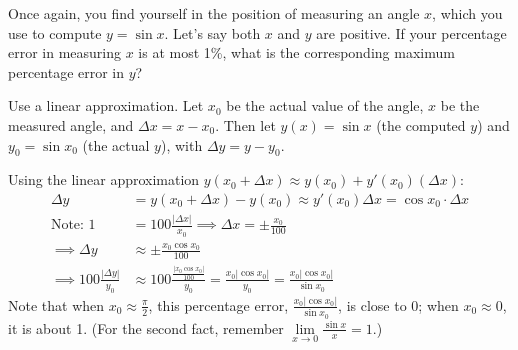 \begin{frame}[t]
\AnswerSpace
{}
Once again, you find yourself in the position of measuring an angle $x$, which you use to compute $y=\sin x$. Let's say both $x$ and $y$ are positive. If your percentage error in measuring $x$ is at most 1\%, what is the corresponding maximum percentage error in $y$?

Use a linear approximation.
\color{answercolor}\vfill\small
{}
Let $x_0$ be the actual value of the angle, $x$ be the measured angle, and $\Delta x=x-x_0$. Then let $y(x)=\sin x$ (the computed $y$) and $y_0=\sin x_0$ (the actual $y$), with $\Delta y = y-y_0$.

Using the linear approximation $y(x_0+\Delta x) \approx y(x_0)+y'(x_0)(\Delta x)$:
\begin{align*}
\Delta y &= y (x_0+\Delta x)-y(x_0) \approx y'(x_0)\Delta x  
           = \cos x_0 \cdot \Delta x\\
\mbox{Note: }1&=100\frac{|\Delta x|}{x_0} \implies 
            \Delta x = \pm \frac{x_0}{100}
\\ \implies \Delta y  &\approx \pm\frac{x_0\cos x_0}{100}\\
\implies 100\frac{| \Delta y|}{y_0}  
            &\approx 100\frac{\frac{|x_0\cos x_0|}{100}}{y_0} 
           = \frac{x_0|\cos x_0|}{y_0} = \frac{x_0|\cos x_0|}{\sin x_0} 
\end{align*}
Note that when $x_0\approx \frac\pi2$, this percentage error, 
$\frac{x_0|\cos x_0|}{\sin x_0}$,  is close to 0; when $x_0 \approx 0$, 
it is about 1. (For the second fact, remember 
$\lim\limits_{x \to 0}\frac{\sin x}{x}=1$.)
\end{frame}


